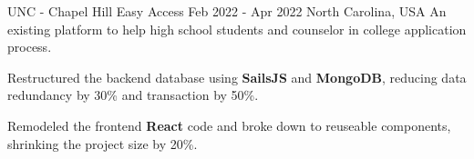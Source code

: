 \begin{cventries}

  \cventry
  {UNC - Chapel Hill} %
  {Easy Access} %
  {Feb 2022 - Apr 2022} %
  {North Carolina, USA} %
  {An existing platform to help high school students and counselor in college application process.}
  {
    \begin{cvitems} %
      \item {Restructured the backend database using \textbf{SailsJS} and \textbf{MongoDB}, reducing data redundancy by 30\% and transaction by 50\%.}
      \item {Remodeled the frontend \textbf{React} code and broke down to reuseable components, shrinking the project size by 20\%.}
    \end{cvitems}
  }


\end{cventries}
